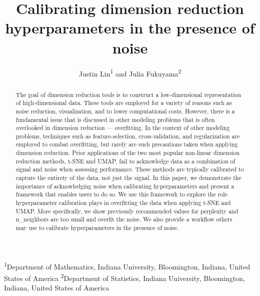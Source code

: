 \documentclass{article}
\title{Calibrating dimension reduction hyperparameters in the presence of noise}
\author{Justin Lin\textsuperscript{1} and Julia Fukuyama\textsuperscript{2}}
\date{}
\begin{document}
\linenumbers
\maketitle

\noindent\textsuperscript{1}Department of Mathematics, Indiana University, Bloomington, Indiana, United States of America
\newline\newline\noindent\textsuperscript{2}Department of Statistics, Indiana University, Bloomington, Indiana, United States of America

\newpage\begin{abstract}
The goal of dimension reduction tools is to construct a low-dimensional representation of high-dimensional data. These tools are employed for a variety of reasons such as noise reduction, visualization, and to lower computational costs. However, there is a fundamental issue that is discussed in other modeling problems that is
often overlooked in dimension reduction --- overfitting. In the context of other modeling problems, techniques such as feature-selection, cross-validation, and regularization are employed to combat overfitting, but rarely are such precautions taken when applying dimension reduction. Prior applications of the two most popular non-linear dimension reduction methods, t-SNE and UMAP, fail to acknowledge data as a combination of signal and noise when assessing performance. These methods are typically calibrated to capture the entirety of the data, not just the signal. In this paper, we demonstrate the importance of acknowledging noise when calibrating hyperparameters and present a framework that enables users to do so. We use this framework to explore the role hyperparameter calibration plays in overfitting the data when applying t-SNE and UMAP. More specifically, we show previously recommended values for perplexity and n\_neighbors are too small and overfit the noise. We also provide a workflow others may use to calibrate hyperparameters in the presence of noise.
\end{abstract}
\end{document}
